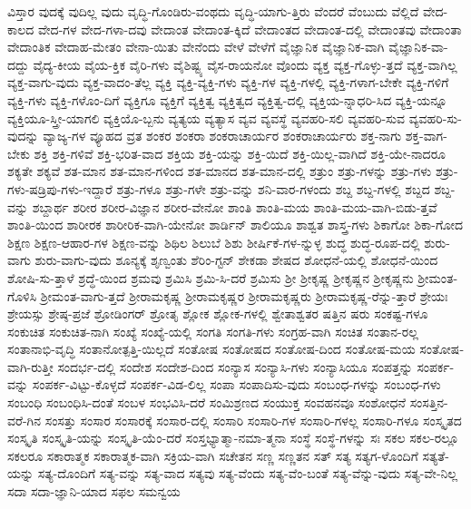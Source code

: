 {ವಿಸ್ತಾರ
ವುದಕ್ಕೆ
ವುದಿಲ್ಲ
ವುದು
ವೃದ್ಧಿ-ಗೊಂಡಿರು-ವಂಥದು
ವೃದ್ಧಿ-ಯಾಗು-ತ್ತಿರು
ವೆಂದರೆ
ವೆಂಬುದು
ವೆಲ್ಲಿದೆ
ವೇದ-ಕಾಲದ
ವೇದ-ಗಳ
ವೇದ-ಗಳಾ-ದವು
ವೇದಾಂತ
ವೇದಾಂತ-ಕ್ಕಿದೆ
ವೇದಾಂತದ
ವೇದಾಂತ-ದಲ್ಲಿ
ವೇದಾಂತವು
ವೇದಾಂತಾ
ವೇದಾಂತಿಕ
ವೇದಾಹ-ಮೇತಂ
ವೇನಾ-ಯಿತು
ವೇನೆಂದು
ವೇಳೆ
ವೇಳೆಗೆ
ವೈಜ್ಞಾನಿಕ
ವೈಜ್ಞಾನಿಕ-ವಾಗಿ
ವೈಜ್ಞಾನಿಕ-ವಾ-ದದ್ದು
ವೈದ್ಯ-ಕೀಯ
ವೈಯ-ಕ್ತಿಕ
ವೈರಿ-ಗಳು
ವೈಶಿಷ್ಟ್ಯ
ವೈಸ-ರಾಯನೋ
ವೊಂದು
ವ್ಯಕ್ತ
ವ್ಯಕ್ತ-ಗೊಳ್ಳು-ತ್ತದೆ
ವ್ಯಕ್ತ-ವಾಗಿಲ್ಲ
ವ್ಯಕ್ತ-ವಾಗು-ವುದು
ವ್ಯಕ್ತ-ವಾದಂ-ತೆಲ್ಲ
ವ್ಯಕ್ತಿ
ವ್ಯಕ್ತಿ-ವ್ಯಕ್ತಿ-ಗಳು
ವ್ಯಕ್ತಿ-ಗಳ
ವ್ಯಕ್ತಿ-ಗಳಲ್ಲಿ
ವ್ಯಕ್ತಿ-ಗಳಾಗ-ಬೇಕೇ
ವ್ಯಕ್ತಿ-ಗಳಿಗೆ
ವ್ಯಕ್ತಿ-ಗಳು
ವ್ಯಕ್ತಿ-ಗಳೊಂ-ದಿಗೆ
ವ್ಯಕ್ತಿಗೂ
ವ್ಯಕ್ತಿಗೆ
ವ್ಯಕ್ತಿತ್ವ
ವ್ಯಕ್ತಿತ್ವದ
ವ್ಯಕ್ತಿತ್ವ-ದಲ್ಲಿ
ವ್ಯಕ್ತಿಯ-ನ್ನಾಧರಿ-ಸಿದ
ವ್ಯಕ್ತಿ-ಯನ್ನೂ
ವ್ಯಕ್ತಿಯೂ-ಸ್ತ್ರೀ-ಯಾಗಲಿ
ವ್ಯಕ್ತಿಯೊ-ಬ್ಬನು
ವ್ಯತ್ಯಯ
ವ್ಯತ್ಯಾಸ
ವ್ಯವ
ವ್ಯವಸ್ಥೆ
ವ್ಯವಹರಿ-ಸಲಿ
ವ್ಯವಹರಿ-ಸುವ
ವ್ಯವಹರಿ-ಸು-ವುದನ್ನು
ವ್ಯಾಜ್ಯ-ಗಳ
ವ್ಯೂಹದ
ವ್ರತ
ಶಂಕರ
ಶಂಕರಾ
ಶಂಕರಾಚಾರ್ಯರ
ಶಂಕರಾಚಾರ್ಯರು
ಶಕ್ತ-ನಾಗು
ಶಕ್ತ-ವಾಗ-ಬೇಕು
ಶಕ್ತಿ
ಶಕ್ತಿ-ಗಳಿವೆ
ಶಕ್ತಿ-ಭರಿತ-ವಾದ
ಶಕ್ತಿಯ
ಶಕ್ತಿ-ಯನ್ನು
ಶಕ್ತಿ-ಯಿದೆ
ಶಕ್ತಿ-ಯಿಲ್ಲ-ವಾಗಿದೆ
ಶಕ್ತಿ-ಯೇ-ನಾದರೂ
ಶಕ್ಯತೇ
ಶಕ್ಯವೆ
ಶತ-ಮಾನ
ಶತ-ಮಾನ-ಗಳಿಂದ
ಶತ-ಮಾನದ
ಶತ-ಮಾನ-ದಲ್ಲಿ
ಶತ್ರುಂ
ಶತ್ರು-ಗಳನ್ನು
ಶತ್ರು-ಗಳು
ಶತ್ರು-ಗಳು-ಷಡ್ರಿಪು-ಗಳು-ಇದ್ದಾರೆ
ಶತ್ರು-ಗಳೂ
ಶತ್ರು-ಗಳೇ
ಶತ್ರು-ವನ್ನು
ಶನಿ-ವಾರ-ಗಳಂದು
ಶಬ್ದ
ಶಬ್ದ-ಗಳಲ್ಲಿ
ಶಬ್ದದ
ಶಬ್ದ-ವನ್ನು
ಶಬ್ದಾರ್ಥ
ಶರೀರ
ಶರೀರ-ವಿಜ್ಞಾನ
ಶರೀರ-ವೇನೋ
ಶಾಂತಿ
ಶಾಂತಿ-ಮಯ
ಶಾಂತಿ-ಮಯ-ವಾಗಿ-ಬಿಡು-ತ್ತವೆ
ಶಾಂತಿ-ಯಿಂದ
ಶಾರೀರಕ
ಶಾರೀರಿಕ-ವಾಗಿ-ಯೇನೋ
ಶಾರ್ಡಿನ್
ಶಾಲಿಯೂ
ಶಾಶ್ವತ
ಶಾಸ್ತ್ರ-ಗಳು
ಶಿಕಾಗೋ
ಶಿಕಾ-ಗೋದ
ಶಿಕ್ಷಣ
ಶಿಕ್ಷಣ-ಆಹಾರ-ಗಳ
ಶಿಕ್ಷಣ-ವನ್ನು
ಶಿಥಿಲ
ಶಿಲುಬೆ
ಶಿಶು
ಶೀರ್ಷಿಕೆ-ಗಳ-ನ್ನುಳ್ಳ
ಶುದ್ಧ
ಶುದ್ಧ-ರೂಪ-ದಲ್ಲಿ
ಶುರು-ವಾಗು
ಶುರು-ವಾಗು-ವುದು
ಶೂನ್ಯಕ್ಕೆ
ಶೃಣ್ವಂತು
ಶೆರಿಂ-ಗ್ಟನ್
ಶೇಕಡಾ
ಶೇಷದ
ಶೋಧನೆ-ಯಲ್ಲಿ
ಶೋಧನೆ-ಯಿಂದ
ಶೋಷಿ-ಸು-ತ್ತಾಳೆ
ಶ್ರದ್ಧೆ-ಯಿಂದ
ಶ್ರಮವು
ಶ್ರಮಿಸಿ
ಶ್ರಮಿ-ಸಿ-ದರೆ
ಶ್ರಮಿಸು
ಶ್ರೀ
ಶ್ರೀಕೃಷ್ಣ
ಶ್ರೀಕೃಷ್ಣನ
ಶ್ರೀಕೃಷ್ಣನು
ಶ್ರೀಮಂತ-ಗೊಳಿಸಿ
ಶ್ರೀಮಂತ-ವಾಗು-ತ್ತದೆ
ಶ್ರೀರಾಮಕೃಷ್ಣ
ಶ್ರೀರಾಮಕೃಷ್ಣರ
ಶ್ರೀರಾಮಕೃಷ್ಣರು
ಶ್ರೀರಾಮಕೃಷ್ಣ-ರೆನ್ನು-ತ್ತಾರೆ
ಶ್ರೇಯಃ
ಶ್ರೇಯಸ್ಸು
ಶ್ರೇಷ್ಠ-ಪ್ರಜೆ
ಶ್ರೋಡಿಂಗರ್
ಶ್ರೋತೃ
ಶ್ಲೋಕ
ಶ್ಲೋಕ-ಗಳಲ್ಲಿ
ಶ್ವೇತಾಶ್ವತರ
ಷತ್ತಿನ
ಷರು
ಸಂಕಷ್ಟ-ಗಳೂ
ಸಂಕುಚಿತ
ಸಂಕುಚಿತ-ನಾಗಿ
ಸಂಖ್ಯೆ
ಸಂಖ್ಯೆ-ಯಲ್ಲಿ
ಸಂಗತಿ
ಸಂಗತಿ-ಗಳು
ಸಂಗ್ರಹ-ವಾಗಿ
ಸಂಚಿತ
ಸಂತಾನ-ರಲ್ಲ
ಸಂತಾನಾಭಿ-ವೃದ್ಧಿ
ಸಂತಾನೋತ್ಪತ್ತಿ-ಯಿಲ್ಲದೆ
ಸಂತೋಷ
ಸಂತೋಷದ
ಸಂತೋಷ-ದಿಂದ
ಸಂತೋಷ-ಮಯ
ಸಂತೋಷ-ವಾಗಿ-ರುತ್ತೀ
ಸಂದರ್ಭ-ದಲ್ಲಿ
ಸಂದೇಶ
ಸಂದೇಶ-ದಿಂದ
ಸಂನ್ಯಾಸ
ಸಂನ್ಯಾಸಿ-ಗಳು
ಸಂನ್ಯಾಸಿಯೂ
ಸಂಪತ್ತನ್ನು
ಸಂಪರ್ಕ-ವನ್ನು
ಸಂಪರ್ಕ-ವಿಟ್ಟು-ಕೊಳ್ಳದೆ
ಸಂಪರ್ಕ-ವಿಡ-ಲಿಲ್ಲ
ಸಂಪಾ
ಸಂಪಾದಿಸು-ವುದು
ಸಂಬಂಧ-ಗಳನ್ನು
ಸಂಬಂಧ-ಗಳು
ಸಂಬಂಧಿ
ಸಂಬಂಧಿಸಿ-ದಂತೆ
ಸಂಬಳ
ಸಂಭವಿಸಿ-ದರೆ
ಸಂಮಿಶ್ರಣದ
ಸಂಯುಕ್ತ
ಸಂವಹನವೂ
ಸಂಶೋಧನೆ
ಸಂಸತ್ತಿನ-ವರೆ-ಗಿನ
ಸಂಸತ್ತು
ಸಂಸಾರ
ಸಂಸಾರಕ್ಕೆ
ಸಂಸಾರ-ದಲ್ಲಿ
ಸಂಸಾರಿ
ಸಂಸಾರಿ-ಗಳ
ಸಂಸಾರಿ-ಗಳಲ್ಲ
ಸಂಸಾರಿ-ಗಳೂ
ಸಂಸ್ಕೃತದ
ಸಂಸ್ಕೃತಿ
ಸಂಸ್ಕೃತಿ-ಯನ್ನು
ಸಂಸ್ಕೃತಿ-ಯೆಂ-ದರೆ
ಸಂಸ್ತಭ್ಯಾತ್ಮಾ-ನಮಾ-ತ್ಮನಾ
ಸಂಸ್ಥೆ
ಸಂಸ್ಥೆ-ಗಳನ್ನು
ಸಃ
ಸಕಲ
ಸಕಲ-ರಲ್ಲೂ
ಸಕಲರೂ
ಸಕಾರಾತ್ಮಕ
ಸಕಾರಾತ್ಮಕ-ವಾಗಿ
ಸಕ್ರಿಯ-ವಾಗಿ
ಸಚೇತನ
ಸಣ್ಣ
ಸಣ್ಣತನ
ಸತ್
ಸತ್ಯ
ಸತ್ಯಗ-ಳೊಂದಿಗೆ
ಸತ್ಯತೆ-ಯನ್ನು
ಸತ್ಯ-ದೊಂದಿಗೆ
ಸತ್ಯ-ವನ್ನು
ಸತ್ಯ-ವಾದ
ಸತ್ಯವು
ಸತ್ಯ-ವೆಂದು
ಸತ್ಯ-ವೆಂ-ಬಂತೆ
ಸತ್ಯ-ವೆನ್ನು-ವುದು
ಸತ್ಯ-ವೇ-ನಿಲ್ಲ
ಸದಾ
ಸದಾ-ಜ್ಞಾನಿ-ಯಾದ
ಸಫಲ
ಸಮನ್ವಯ
}
